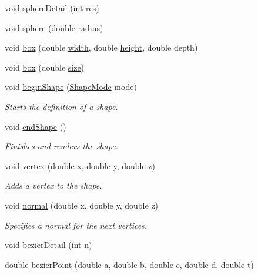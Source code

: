 \begin{DoxyCompactItemize}
void \hyperlink{namespacecprocessing_a2a78420636e3fcd21e96f87be4b74316}{sphere\-Detail} (int res)
\item 
void \hyperlink{namespacecprocessing_ad12fe2bf0a14c6759624d8f6b66f5bd0}{sphere} (double radius)
\item 
void \hyperlink{namespacecprocessing_a28f122c44889d93bb070076ff6aaab9d}{box} (double \hyperlink{namespacecprocessing_a7af937eb8772235def57fcadd10fc82a}{width}, double \hyperlink{namespacecprocessing_ac392753eef02e2ad4ad84f5a076919be}{height}, double depth)
\item 
void \hyperlink{namespacecprocessing_acf30698a684da4beb34cee1ddbf37e60}{box} (double \hyperlink{namespacecprocessing_a4bbf578baacdd32fea5fab20517028ce}{size})
\item 
void \hyperlink{namespacecprocessing_afac44ac31031e9f27d12973e074230ff}{begin\-Shape} (\hyperlink{namespacecprocessing_a03538783321a3683ed8660f8bb23cd0c}{\-Shape\-Mode} mode)
\begin{DoxyCompactList}\small\item\em \-Starts the definition of a shape. \end{DoxyCompactList}\item 
void \hyperlink{namespacecprocessing_a1f0b4b628bd9d68c9321327a6ac7daf5}{end\-Shape} ()
\begin{DoxyCompactList}\small\item\em \-Finishes and renders the shape. \end{DoxyCompactList}\item 
void \hyperlink{namespacecprocessing_a790d9b7ae403d8cba72ae1c2f84f2fa7}{vertex} (double x, double y, double z)
\begin{DoxyCompactList}\small\item\em \-Adds a vertex to the shape. \end{DoxyCompactList}\item 
void \hyperlink{namespacecprocessing_a6d6f091f69de94483718a2a27d78f233}{normal} (double x, double y, double z)
\begin{DoxyCompactList}\small\item\em \-Specifies a normal for the next vertices. \end{DoxyCompactList}\item 
void \hyperlink{namespacecprocessing_aab8885eae2719fac74c66473a6c49d33}{bezier\-Detail} (int n)
\item 
double \hyperlink{namespacecprocessing_aaa32b0ef424d3452942ee2b0c9700a07}{bezier\-Point} (double a, double b, double c, double d, double t)

\end{DoxyCompactItemize}
